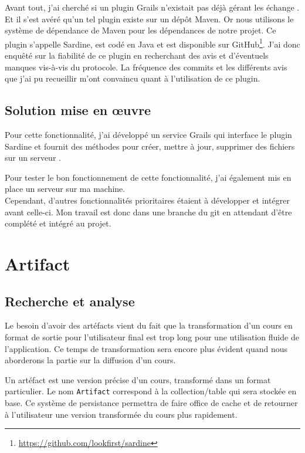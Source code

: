 Avant tout, j'ai cherché si un plugin Grails n'existait pas déjà gérant les
échange . Et il s'est avéré qu'un tel plugin existe sur un dépôt Maven. Or
nous utilisons le système de dépendance de Maven pour les dépendances de notre
projet. Ce plugin s'appelle Sardine, est codé en Java et est disponible sur
GitHub\footnote{\url{https://github.com/lookfirst/sardine}}. J'ai donc enquêté
sur la fiabilité de ce plugin en recherchant des avis et d'éventuels manques
vis-à-vis du protocole. La fréquence des commits et les différents avis que j'ai
pu recueillir m'ont convaincu quant à l'utilisation de ce plugin.

\subsection{Solution mise en \oe uvre}
Pour cette fonctionnalité, j'ai développé un service Grails qui interface le
plugin Sardine et fournit des méthodes pour créer, mettre à jour, supprimer
des fichiers sur un serveur .

Pour tester le bon fonctionnement de cette fonctionnalité, j'ai également mis en
place un serveur  sur ma machine.\\

Cependant, d'autres fonctionnalités prioritaires étaient à développer et
intégrer avant celle-ci. Mon travail est donc dans une branche du git en
attendant d'être complété et intégré au projet.

\section{Artifact}
\subsection{Recherche et analyse}
Le besoin d'avoir des artéfacts vient du fait que la transformation d'un cours en
format de sortie pour l'utilisateur final est trop long pour une utilisation
fluide de l'application. Ce temps de transformation sera encore plus évident
quand nous aborderons la partie sur la diffusion d'un cours.

Un artéfact est une version précise d'un cours, transformé dans un format
particulier. Le nom {\tt Artifact} correspond à la collection/table qui sera
stockée en base. Ce système de persistance permettra de faire office de cache et
de retourner à l'utilisateur une version transformée du cours plus rapidement.

